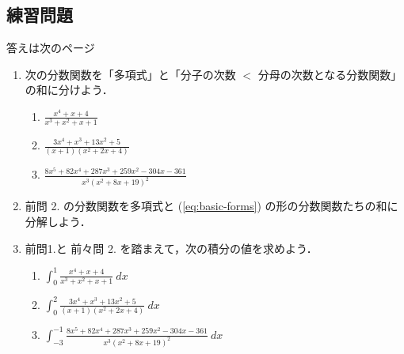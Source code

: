 \documentclass[10pt, uplatex, dvipdfmx]{jsarticle}
\theoremstyle{definition}
\numberwithin{equation}{section}
\newcommand{\ds}{\displaystyle}
\begin{document}
\newpage

\subsection{練習問題}

答えは次のページ

\vspace{1zh}

\begin{enumerate}
  \setlength{\itemsep}{2zh}
  

\item 次の分数関数を「多項式」と「分子の次数 $<$ 分母の次数となる分数関数」の和に分けよう．

  \vspace{1zh}

  \begin{enumerate}[(1)]
    \setlength{\itemsep}{3zh}
    
  \item $\ds \frac{x^4+x+4}{x^3+x^2+x+1}$

  \item $\ds \frac{3x^4+x^3+13x^2+5}{(x+1)(x^2+2x+4)}$

  \item $\ds \frac{8x^5 + 82 x^4 + 287 x^3 + 259 x^2 -304 x -361}{x^3 (x^2+8x+19)^2}$
    
  \end{enumerate}

\item 前問 2. の分数関数を多項式と (\ref{eq:basic-forms}) の形の分数関数たちの和に分解しよう．
  
\item 前問1.と 前々問 2. を踏まえて，次の積分の値を求めよう．

  \vspace{1zh}
  
  \begin{enumerate}[(1)]
    \setlength{\itemsep}{2zh}
    
  \item $\ds \int_{0}^{1} \frac{x^4+x+4}{x^3+x^2+x+1} \ dx$
    
  \item $\ds \int_{0}^{2} \frac{3x^4+x^3+13x^2+5}{(x+1)(x^2+2x+4)} \ dx$
    
  \item $\ds \int_{-3}^{-1} \frac{8x^5 + 82 x^4 + 287 x^3 + 259 x^2 -304 x -361}{x^3 (x^2+8x+19)^2} \ dx$
    
  \end{enumerate}
  
\end{enumerate}
\end{document}
